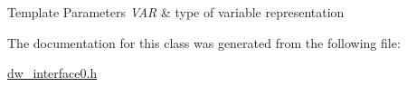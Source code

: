 \begin{DoxyTemplParams}{Template Parameters}
{\em V\+AR} & type of variable representation \\
\hline
\end{DoxyTemplParams}


The documentation for this class was generated from the following file\+:\begin{DoxyCompactItemize}
\item 
\hyperlink{dw__interface0_8h}{dw\+\_\+interface0.\+h}\end{DoxyCompactItemize}
